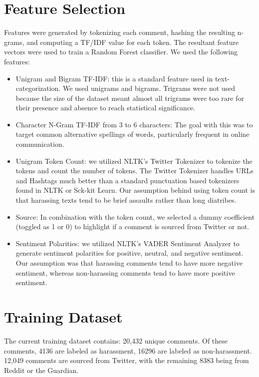 \documentclass[11pt,a4paper]{article}
\begin{document}
\section{Feature Selection}
Features were generated by tokenizing each comment,
hashing the resulting n-grams, and computing
a TF/IDF value for each token. The resultant
feature vectors were used to train a Random Forest
classifier. We used the following features:

\begin{itemize}
\item Unigram and Bigram TF-IDF: this is a
standard feature used in text-categorization.
We used unigrams and bigrams. Trigrams
were not used because the size of the dataset
meant almost all trigrams were too rare for
their presence and absence to reach statistical
significance.
\item Character N-Gram TF-IDF from 3 to 6
characters: The goal with this was to target
common alternative spellings of words, particularly
frequent in online communication.
\item Unigram Token Count: we utilized
NLTK’s Twitter Tokenizer to tokenize the
tokens and count the number of tokens. The
Twitter Tokenizer handles URLs and
Hashtags much better than a standard
punctuation based tokenizers found in NLTK
or Sck-kit Learn. Our assumption behind
using token count is that harassing texts tend
to be brief assaults rather than long diatribes.
\item Source: In combination with the token
count, we selected a dummy coefficient (toggled
as 1 or 0) to highlight if a comment is
sourced from Twitter or not.
\item Sentiment Polarities: we utilized NLTK’s
VADER Sentiment Analyzer to generate sentiment
polarities for positive, neutral, and
negative sentiment. Our assumption was that
harassing comments tend to have more negative
sentiment, whereas non-harassing comments
tend to have more positive sentiment.
\end{itemize}

\section{Training Dataset}
The current training dataset contains: 20,432
unique comments. Of these comments, 4136 are labeled
as harassment, 16296 are labeled as non-harassment.
12,049 comments are sourced from Twitter,
with the remaining 8383 being from Reddit or
the Guardian.
\end{document}
